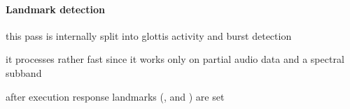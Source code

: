 \paragraph{Landmark detection}
\begin{itemize*}
	\item this pass is internally split into glottis activity and burst detection
	\item it processes rather fast since it works only on partial audio data and a spectral subband
	\item after execution response landmarks (,  and ) are set
\end{itemize*}


